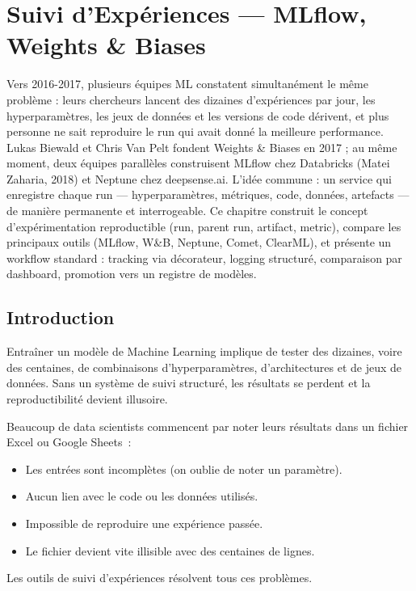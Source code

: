 \chapter{Suivi d'Exp\'eriences --- MLflow, Weights \& Biases}
\label{ch:suivi-experiences}

Vers 2016-2017, plusieurs équipes ML constatent simultanément le même problème : leurs chercheurs lancent des dizaines d'expériences par jour, les hyperparamètres, les jeux de données et les versions de code dérivent, et plus personne ne sait reproduire le run qui avait donné la meilleure performance. Lukas Biewald et Chris Van Pelt fondent Weights \& Biases en 2017 ; au même moment, deux équipes parallèles construisent MLflow chez Databricks (Matei Zaharia, 2018) et Neptune chez deepsense.ai. L'idée commune : un service qui enregistre chaque run --- hyperparamètres, métriques, code, données, artefacts --- de manière permanente et interrogeable. Ce chapitre construit le concept d'expérimentation reproductible (run, parent run, artifact, metric), compare les principaux outils (MLflow, W\&B, Neptune, Comet, ClearML), et présente un workflow standard : tracking via décorateur, logging structuré, comparaison par dashboard, promotion vers un registre de modèles.

\section{Introduction}

Entra\^iner un mod\`ele de Machine Learning implique de tester des dizaines,
voire des centaines, de combinaisons d'hyperparam\`etres, d'architectures et
de jeux de donn\'ees. Sans un syst\`eme de suivi structur\'e, les r\'esultats
se perdent et la reproductibilit\'e devient illusoire.

\begin{antipattern}[title=\textbf{L'anti-pattern du tableur}]
Beaucoup de data scientists commencent par noter leurs r\'esultats dans un
fichier Excel ou Google Sheets~:
\begin{itemize}
  \item Les entr\'ees sont incompl\`etes (on oublie de noter un param\`etre).
  \item Aucun lien avec le code ou les donn\'ees utilis\'es.
  \item Impossible de reproduire une exp\'erience pass\'ee.
  \item Le fichier devient vite illisible avec des centaines de lignes.
\end{itemize}
Les outils de suivi d'exp\'eriences r\'esolvent tous ces probl\`emes.
\end{antipattern}

